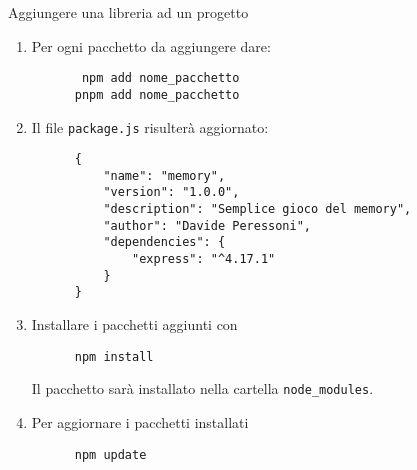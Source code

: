 \begin{frame}[fragile]{Aggiungere una libreria ad un progetto}\transfade\centering
  \begin{enumerate}[<+->]
    \item Per ogni pacchetto da aggiungere dare:
    \begin{verbatim}
       npm add nome_pacchetto
      pnpm add nome_pacchetto
    \end{verbatim}
    \item[] Il file \texttt{package.js} risulterà aggiornato:
    \begin{verbatim}
      {
          "name": "memory",
          "version": "1.0.0",
          "description": "Semplice gioco del memory",
          "author": "Davide Peressoni",
          "dependencies": {
              "express": "^4.17.1"
          }
      }
    \end{verbatim}
    \item Installare i pacchetti aggiunti con
    \begin{verbatim}
      npm install
    \end{verbatim}
    Il pacchetto sarà installato nella cartella \texttt{node\_modules}.
    \makeatletter
    \let\temp@theenumi\theenumi
    \def\theenumi{}
    \makeatother
    \item Per aggiornare i pacchetti installati
    \makeatletter
    \let\theenumi\temp@theenumi
    \makeatother
    \begin{verbatim}
      npm update
    \end{verbatim}
  \end{enumerate}
\end{frame}